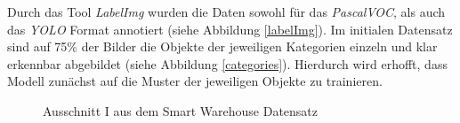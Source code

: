 Durch das Tool \textit{LabelImg} wurden die Daten sowohl für das \textit{PascalVOC}, als auch das \textit{YOLO} Format annotiert (siehe Abbildung \ref{labelImg}). Im initialen Datensatz sind auf 75\% der Bilder die Objekte der jeweiligen Kategorien einzeln und klar erkennbar abgebildet (siehe Abbildung \ref{categories}). Hierdurch wird erhofft, dass Modell zunächst auf die Muster der jeweiligen Objekte zu trainieren. 

\begin{figure}[H]
	\hfill
	\hfill
	\hfill
	\hfill
	\caption{Ausschnitt I aus dem Smart Warehouse Datensatz}
	\label{dataset}
\end{figure}

